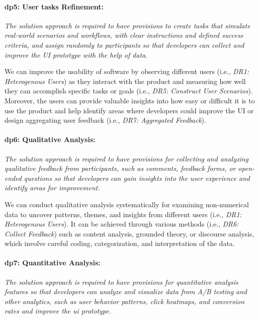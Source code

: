 \paragraph{\ac{dp}5: User tasks Refinement:} \textit{The solution approach is required to have provisions to create tasks that simulate real-world scenarios and workflows, with clear instructions and defined success criteria, and assign randomly to participants so that developers can collect and improve the UI prototype with the help of data.}

We can improve the usability of software by observing different users (i.e., \textit{DR1: Heterogenous Users}) as they interact with the product and measuring how well they can accomplish specific tasks or goals (i.e., \textit{DR5: Construct User Scenarios}).
Moreover, the users can provide valuable insights into how easy or difficult it is to use the product and help identify areas where developers could improve the UI or design aggregating user feedback (i.e., \textit{DR7: Aggregated Feedback}).

\paragraph{\ac{dp}6: Qualitative Analysis:} \textit{The solution approach is required to have provisions for collecting and analyzing qualitative feedback from participants, such as comments, feedback forms, or open-ended questions so that developers can gain insights into the user experience and identify areas for improvement.}

We can conduct qualitative analysis systematically for examining non-numerical data to uncover patterns, themes, and insights from different users (i.e., \textit{DR1: Heterogenous Users}). 
It can be achieved through various methods (i.e., \textit{DR6: Collect Feedback}) such as content analysis, grounded theory, or discourse analysis, which involve careful coding, categorization, and interpretation of the data.

\paragraph{\ac{dp}7: Quantitative Analysis:} \textit{The solution approach is required to have provisions for quantitative analysis features so that developers can analyze and visualize data from A/B testing and other analytics, such as user behavior patterns, click heatmaps, and conversion rates and improve the \ac{ui} prototype.}

